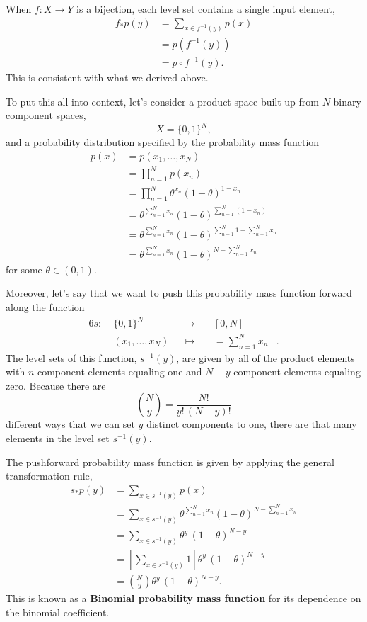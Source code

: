\documentclass[
  letterpaper,
  DIV=11,
  numbers=noendperiod]{scrartcl}
\begin{document}
When \(f : X \rightarrow Y\) is a bijection, each level set contains a
single input element, \begin{align*}
f_{*} p(y)
&= \sum_{x \in f^{-1}(y)} p(x)
\\
&= p(f^{-1}(y))
\\
&= p \circ f^{-1}(y).
\end{align*} This is consistent with what we derived above.

To put this all into context, let's consider a product space built up
from \(N\) binary component spaces, \[
X = \{ 0, 1 \}^{N},
\] and a probability distribution specified by the probability mass
function \begin{align*}
p(x)
&=
p(x_{1}, \ldots, x_{N})
\\
&=
\prod_{n = 1}^{N} p(x_{n})
\\
&=
\prod_{n = 1}^{N} \theta^{x_{n}} (1 - \theta)^{1 - x_{n}}
\\
&=
\theta^{\sum_{n = 1}^{N} x_{n}}
(1 - \theta)^{\sum_{n = 1}^{N} (1 - x_{n})}
\\
&=
\theta^{\sum_{n = 1}^{N} x_{n}}
(1 - \theta)^{\sum_{n = 1}^{N} 1 - \sum_{n = 1}^{N} x_{n}}
\\
&=
\theta^{\sum_{n = 1}^{N} x_{n}}
(1 - \theta)^{N - \sum_{n = 1}^{N} x_{n}}
\end{align*} for some \(\theta \in (0, 1)\).

Moreover, let's say that we want to push this probability mass function
forward along the function \begin{alignat*}{6}
s :\; & \{ 0, 1 \}^{N} & &\rightarrow& \; & [0, N] &
\\
& (x_{1}, \ldots, x_{N} ) & &\mapsto& & = \sum_{n = 1}^{N} x_{n}  &.
\end{alignat*} The level sets of this function, \(s^{-1}(y)\), are given
by all of the product elements with \(n\) component elements equaling
one and \(N - y\) component elements equaling zero. Because there are \[
{N \choose y} = \frac{N!}{y! \, (N - y)!}
\] different ways that we can set \(y\) distinct components to one,
there are that many elements in the level set \(s^{-1}(y)\).

The pushforward probability mass function is given by applying the
general transformation rule, \begin{align*}
s_{*} p(y)
&=
\sum_{x \in s^{-1}(y) } p(x)
\\
&=
\sum_{x \in s^{-1}(y) }
\theta^{\sum_{n = 1}^{N} x_{n}}
(1 - \theta)^{N - \sum_{n = 1}^{N} x_{n}}
\\
&=
\sum_{x \in s^{-1}(y) }
\theta^{y} \, (1 - \theta)^{N - y}
\\
&=
\left[ \sum_{x \in s^{-1}(y) } 1 \right]
\theta^{y} \, (1 - \theta)^{N - y}
\\
&=
{N \choose y} \theta^{y} \, (1 - \theta)^{N - y}.
\end{align*} This is known as a \textbf{Binomial probability mass
function} for its dependence on the binomial coefficient.
\end{document}
